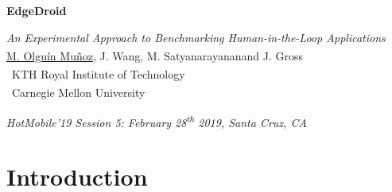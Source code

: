 \documentclass[aspectratio=1610]{beamer}
\newcommand{\kthaffil}{\textsuperscript{\textdagger}}
\newcommand{\cmuaffil}{\textsuperscript{\textdaggerdbl}}
\begin{document}
\startpage
\begin{frame}{}
    \begin{center}
        \begin{LARGE}
            \textbf{EdgeDroid}\\
        \end{LARGE}
        \emph{An Experimental Approach to Benchmarking Human-in-the-Loop Applications}\\
        \vspace{0.02\textheight}
        {\footnotesize \underline{M. Olguín Muñoz}\kthaffil, J. Wang\cmuaffil, M. Satyanarayanan\cmuaffil and J. Gross\kthaffil\\
            \vspace{0.02\textheight}
            \kthaffil~KTH Royal Institute of Technology\\
            \cmuaffil~Carnegie Mellon University\\}
    \end{center}

    \vspace{0.04\textheight}

    \begin{tiny}
        \raggedleft%
        \emph{HotMobile'19 Session 5: February 28\textsuperscript{th} 2019, Santa Cruz, CA}\\
    \end{tiny}
\end{frame}

\normalpage%
{
    \AtBeginSection[]{}
    \section{Introduction}
}
\end{document}
